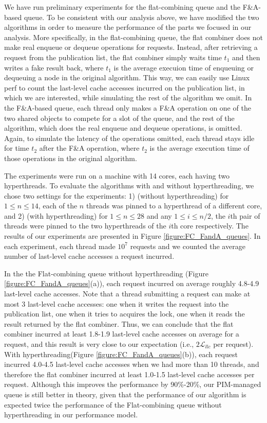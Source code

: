 \documentclass[11pt]{article}
\newcommand{\latllc} {\mathcal{L}_{llc}}
\begin{document}
We have run preliminary experiments for the flat-combining queue and the F\&A-based queue. 
To be consistent with our analysis above, we have modified the two algorithms in order to 
measure the performance of the parts we focused in our analysis.  
More specifically, in the flat-combining queue, the flat combiner does not make 
real enqueue or dequeue operations for requests. 
Instead, after retrieving a request from the publication list, 
the flat combiner simply waits time $t_1$ and then writes a fake result back, 
where $t_1$ is the average execuion time of enqueuing or dequeuing a node in the original algorithm. 
This way, we can easily use Linux perf to count the last-level cache accesses incurred 
on the publication list, in which we are interested, while simulating the rest of the algorithm we omit. 
In the F\&A-based queue, each thread only makes a F\&A operation on one of the two shared objects 
to compete for a slot of the queue, and the rest of the algorithm, 
which does the real enqueue and dequeue operations, is omitted. 
Again, to simulate the latency of the operations omitted, each thread stays idle for time $t_2$ after 
the F\&A operation, where $t_2$ is the average execution time of those operations in the original algorithm.


The experiments were run on a machine with 14 cores, each having two hyperthreads. 
To evaluate the algorithms with and without hyperthreading, we chose two settings for the experiments: 
1) (without hyperthreading) for $1 \le n \le 14$, 
each of the $n$ threads was pinned to a hyperthread of a different core, and
2) (with hyperthreading) for $1 \le n \le 28$ and any $1\le i \le n/2$, 
the $i$th pair of threads were pinned to the two hyperthreads of the $i$th core respectively. 
The results of our experiments are presented in Figure \ref{figure:FC_FandA_queues}. 
In each experiment, each thread made $10^7$ requests and we counted the average number of last-level cache 
accesses a request incurred. 

In the the Flat-combining queue without hyperthreading (Figure \ref{figure:FC_FandA_queues}(a)), 
each request incurred on average roughly 4.8-4.9 last-level cache accesses. 
Note that a thread submitting a request can make at most 3 last-level cache accesses: 
one when it writes the request into the publication list, one when it tries to acquires the lock, 
one when it reads the result returned by the flat combiner. 
Thus, we can conclude that the flat combiner incurred at least 1.8-1.9 last-level cache accesses 
on average for a request, and this result is very close to our expectation (i.e., $2\latllc$ per request). 
With hyperthreading(Figure \ref{figure:FC_FandA_queues}(b)), 
each request incurred 4.0-4.5 last-level cache accesses when we had more than 10 threads, 
and therefore the flat combiner incurred at least 1.0-1.5 last-level cache accesses per request. 
Although this improves the performance by 90\%-20\%, our PIM-managed queue is still better in theory, 
given that the performance of our algorithm is expected twice the performance of the Flat-combining queue 
without hyperthreading in our performance model. 
\end{document}
